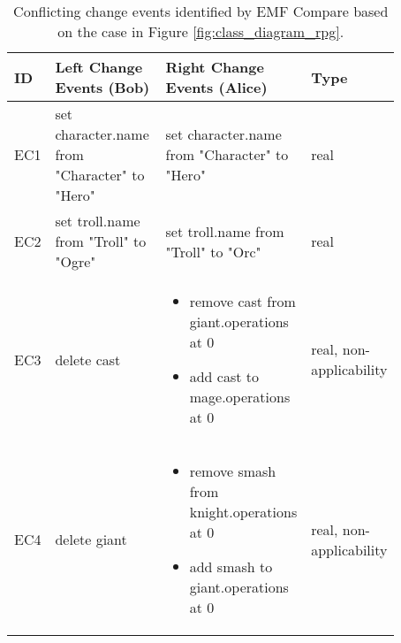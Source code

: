 \begin{table*}[ht]
  \centering
  \caption{Conflicting change events identified by EMF Compare based on the case in Figure \ref{fig:class_diagram_rpg}.}
  \begin{scriptsize}
    \label{table:emfc_conflicts}
    \begin{tabular}{|p{0.04\linewidth}|p{0.36\linewidth}|p{0.36\linewidth}|
        p{0.11\linewidth}|}
      \hline
      \textbf{ID} &
      \textbf{Left Change Events (Bob)} &
      \textbf{Right Change Events (Alice)} &
      \textbf{Type}\\
      \hline
      EC1 &
      set character.name from "Character" to "Hero" &
      set character.name from "Character" to "Hero" &
      real \\
      \hline
      EC2 & set troll.name from "Troll" to "Ogre" &
      set troll.name from "Troll" to "Orc" &
      real \\
      \hline
      EC3 &
      delete cast
      &
      \begin{minipage}[t]{\linewidth}
        \raggedright
        \begin{itemize}[leftmargin=0pt]
          \setlength
          \item[] remove cast from giant.operations at 0
          \item[] add cast to mage.operations at 0
        \end{itemize}
      \end{minipage}
      &
      real, non-applicability\\
      \hline
      EC4 &
      delete giant
      &
      \begin{minipage}[t]{\linewidth}
        \raggedright
        \begin{itemize}[leftmargin=0pt]
          \setlength
          \item[] remove smash from knight.operations at 0
          \item[] add smash to giant.operations at 0
        \end{itemize}
      \end{minipage}
      &
      real, non-applicability\\
      \hline
    \end{tabular}
  \end{scriptsize}
\end{table*}

